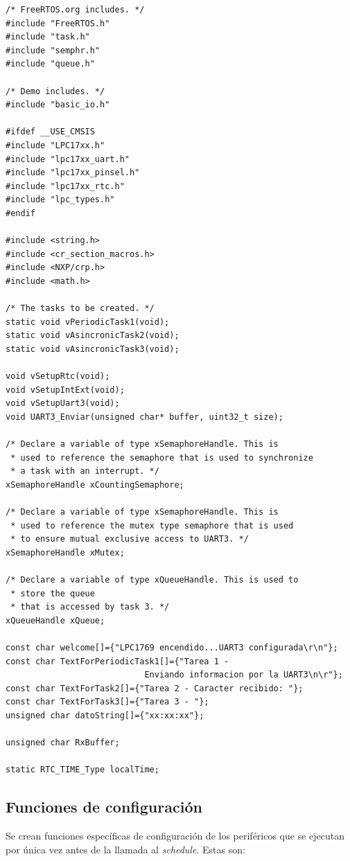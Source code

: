 \documentclass[a4paper,12pt]{article}
\begin{document}
\begin{verbatim}
/* FreeRTOS.org includes. */
#include "FreeRTOS.h"
#include "task.h"
#include "semphr.h"
#include "queue.h"

/* Demo includes. */
#include "basic_io.h"

#ifdef __USE_CMSIS
#include "LPC17xx.h"
#include "lpc17xx_uart.h"
#include "lpc17xx_pinsel.h"
#include "lpc17xx_rtc.h"
#include "lpc_types.h"
#endif

#include <string.h>
#include <cr_section_macros.h>
#include <NXP/crp.h>
#include <math.h>

/* The tasks to be created. */
static void vPeriodicTask1(void);
static void vAsincronicTask2(void);
static void vAsincronicTask3(void);

void vSetupRtc(void);
void vSetupIntExt(void);
void vSetupUart3(void);
void UART3_Enviar(unsigned char* buffer, uint32_t size);

/* Declare a variable of type xSemaphoreHandle. This is 
 * used to reference the semaphore that is used to synchronize
 * a task with an interrupt. */
xSemaphoreHandle xCountingSemaphore;

/* Declare a variable of type xSemaphoreHandle. This is 
 * used to reference the mutex type semaphore that is used
 * to ensure mutual exclusive access to UART3. */
xSemaphoreHandle xMutex;

/* Declare a variable of type xQueueHandle. This is used to
 * store the queue
 * that is accessed by task 3. */
xQueueHandle xQueue;

const char welcome[]={"LPC1769 encendido...UART3 configurada\r\n"};
const char TextForPeriodicTask1[]={"Tarea 1 - 
							Enviando informacion por la UART3\n\r"};
const char TextForTask2[]={"Tarea 2 - Caracter recibido: "};
const char TextForTask3[]={"Tarea 3 - "};
unsigned char datoString[]={"xx:xx:xx"};

unsigned char RxBuffer;

static RTC_TIME_Type localTime;
\end{verbatim}

\subsection{Funciones de configuración}

Se crean funciones específicas de configuración de los periféricos que se ejecutan por única vez antes de la llamada al \textit{schedule}.  Estas son:
\end{document}
